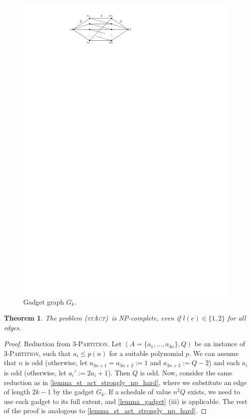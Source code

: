 \documentclass[10pt,a4paper]{article}
\newtheorem{theorem}{Theorem}[section]
\numberwithin{equation}{section}
\newcommand{\set}[1]{\{ #1 \}}
\newcommand{\fromto}[2]{\set{#1, \ldots, #2}}
\newcommand{\stact}{\textsc{(stAct)}}
\begin{document}
\begin{figure}[htpb]
\centering
\includegraphics[scale=1]{img/gadget-new}
\caption{Gadget graph $G_k$.}
\label{fig_gadget}
\end{figure}

\begin{theorem}
The problem \stact\ is NP-complete, even if $l(e) \in \set{1, 2}$ for all edges.
\end{theorem}
\begin{proof}
Reduction from \textsc{3-Partition}. Let $(A = \fromto{a_1}{a_{3n}}, Q)$ be an instance of \textsc{3-Partition}, such that $a_i \leq p(n)$ for a suitable polynomial $p$. We can assume that $n$ is odd (otherwise, let $a_{3n+1} = a_{3n + 2} := 1$ and $a_{3n + 3} :=  Q - 2$) and each $a_i$ is odd (otherwise, let $a_i' := 2a_i + 1$). Then $Q$ is odd. Now, consider the same reduction as in \cref{lemma_st_act_strongly_np_hard}, where we substitute an edge of length $2k - 1$ by the gadget $G_k$. If a schedule of value $n^2Q$ exists, we need to use each gadget to its full extent, and \cref{lemma_gadget} (iii) is applicable. The rest of the proof is analogous to \cref{lemma_st_act_strongly_np_hard}.
\end{proof}
\end{document}
